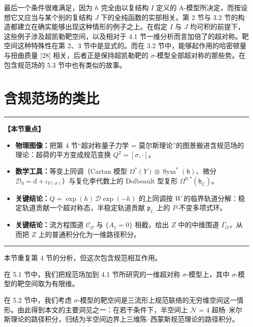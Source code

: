 \documentclass[11pt,a4paper,UTF8]{ctexart}
\theoremstyle{plain}
\theoremstyle{definition}
\newenvironment{keypoints}{%
  \par\addvspace{0.9em}%
  \noindent\begin{minipage}{\linewidth}%
  \color{black!80}\rule{\linewidth}{0.6pt}\par\vspace{2pt}%
  \noindent\textbf{【本节重点】}\par\vspace{2pt}%
  \begin{itemize}[leftmargin=1.6em,itemsep=1pt,topsep=2pt,parsep=0pt]%
}{%
  \end{itemize}\vspace{1pt}\noindent\color{black!80}\rule{\linewidth}{0.6pt}%
  \end{minipage}\par\addvspace{0.9em}%
}
\begin{document}


最后一个条件很难满足，因为 $h$ 完全由以复结构 $I$ 定义的 A-模型所决定，而按设想它又应当与某个别的复结构 $J$ 下的全纯函数的实部相关。第 2 节与 3.2 节的构造都建立在确实能够出现这种情形的例子之上。在假定 $I$ 与 $J$ 均可积的前提下，这些例子涉及超凯勒靶空间，以及相对于 4.1 节一维分析而言加倍了的超对称。靶空间这种特殊性在第 2、3 节中是显式的。而在 3.2 节中，能够起作用的哈密顿量与扭曲质量 [28] 相关，后者正是保持超凯勒靶的 $\sigma$-模型全部超对称的那些势。在包含规范场的 5.3 节中也有类似的故事。

\section{含规范场的类比}
\begin{keypoints}
    \item \textbf{物理图像：}把第 4 节“超对称量子力学 = 莫尔斯理论”的图景搬进含规范场的理论：超荷的平方变成规范变换 $Q^2=[\sigma,\cdot]$。
    \item \textbf{数学工具：}等变上同调（Cartan 模型 $\Omega^*(Y)\otimes\operatorname{Sym}^*(\mathfrak h)$、微分 $\mathcal D_0=\mathrm d+\iota_{V(\sigma)}$）与复化李代数上的 Dolbeault 型复形 $\Omega^{0,*}(\mathfrak h_{\mathbb C})$。
    \item \textbf{关键结论：}$Q=\exp(h)\,\mathcal D\exp(-h)$ 的上同调按 $W$ 的临界轨道分解：稳定轨道贡献一个超对称态，半稳定轨道贡献 $\mathfrak p_{\mathbb C}$ 上的 $P$-不变多项式环。
    \item \textbf{关键结论：}流方程围道 $\mathcal C_{\mathcal O}$ 与 $\{A_1=0\}$ 相截，给出 $Z$ 中的中维围道 $\Gamma_{\mathcal O}$，从而把 $Z$ 上的普通积分化为一维路径积分。
\end{keypoints}

本节重复第 4 节的分析，但这次包含规范相互作用。

在 5.1 节中，我们把规范场加到 4.1 节所研究的一维超对称 $\sigma$-模型上，其中 $\sigma$-模型的靶空间取为有限维。

在 5.2 节中，我们考虑 $\sigma$-模型的靶空间是三流形上规范联络的无穷维空间这一情形。由此得到本文的主要洞见之一：在若干条件下，半空间上 $\mathcal N=4$ 超杨–米尔斯理论的路径积分，归结为半空间边界上三维陈–西蒙斯规范理论的路径积分。
\end{document}
